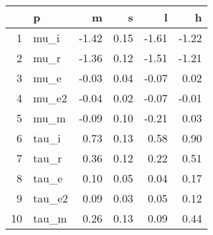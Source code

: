 \begin{table}[ht]
\centering
\begin{tabular}{rlrrrr}
  \hline
 & p & m & s & l & h \\ 
  \hline
1 & mu\_i & -1.42 & 0.15 & -1.61 & -1.22 \\ 
  2 & mu\_r & -1.36 & 0.12 & -1.51 & -1.21 \\ 
  3 & mu\_e & -0.03 & 0.04 & -0.07 & 0.02 \\ 
  4 & mu\_e2 & -0.04 & 0.02 & -0.07 & -0.01 \\ 
  5 & mu\_m & -0.09 & 0.10 & -0.21 & 0.03 \\ 
  6 & tau\_i & 0.73 & 0.13 & 0.58 & 0.90 \\ 
  7 & tau\_r & 0.36 & 0.12 & 0.22 & 0.51 \\ 
  8 & tau\_e & 0.10 & 0.05 & 0.04 & 0.17 \\ 
  9 & tau\_e2 & 0.09 & 0.03 & 0.05 & 0.12 \\ 
  10 & tau\_m & 0.26 & 0.13 & 0.09 & 0.44 \\ 
   \hline
\end{tabular}
\label{tab:param}
\end{table}
